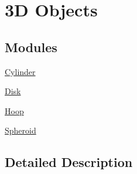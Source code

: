 \hypertarget{group___e_g_x_math-_geometry-3_d}{}\section{3D Objects}
\label{group___e_g_x_math-_geometry-3_d}
\subsection*{Modules}
\begin{DoxyCompactItemize}
\item 
\mbox{\hyperlink{group___e_g_x_math-_geometry-3_d-_cylinder}{Cylinder}}
\item 
\mbox{\hyperlink{group___e_g_x_math-_geometry-3_d-_disk}{Disk}}
\item 
\mbox{\hyperlink{group___e_g_x_math-_geometry-3_d-_hoop}{Hoop}}
\item 
\mbox{\hyperlink{group___e_g_x_math-_geometry-3_d-_spheroid}{Spheroid}}
\end{DoxyCompactItemize}


\subsection{Detailed Description}
